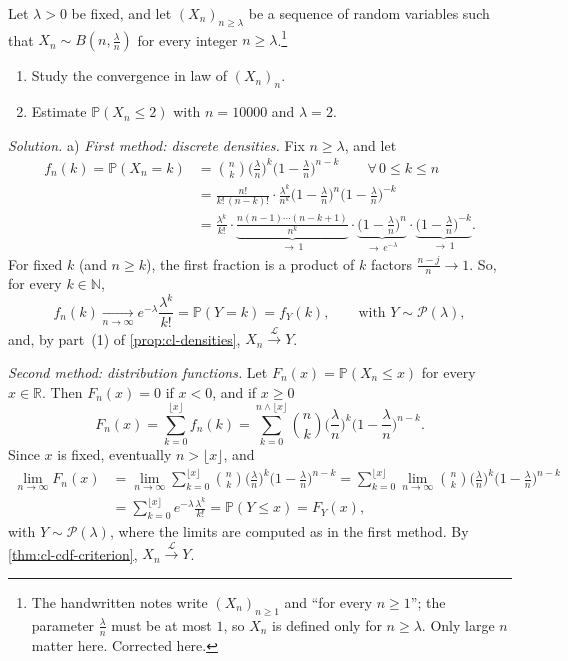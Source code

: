 \begin{example}\label{exa:cl-binomial-poisson}
Let $\lambda>0$ be fixed, and let $(X_n)_{n\ge\lambda}$ be a sequence of random variables such
that $X_n\sim B(n,\frac\lambda n)$ for every integer $n\ge\lambda$.\footnote{The handwritten
notes write $(X_n)_{n\ge1}$ and ``for every $n\ge1$''; the parameter $\frac\lambda n$ must be at
most $1$, so $X_n$ is defined only for $n\ge\lambda$. Only large $n$ matter here. Corrected
here.}
\begin{enumerate}[label=\alph*)]
  \item Study the convergence in law of $(X_n)_n$.
  \item Estimate $\mathbb P(X_n\le2)$ with $n=10000$ and $\lambda=2$.
\end{enumerate}

\emph{Solution.} a) \emph{First method: discrete densities.} Fix $n\ge\lambda$, and let
\[
\begin{aligned}
  f_n(k)=\mathbb P(X_n=k)&=\binom nk\Big(\frac\lambda n\Big)^k\Big(1-\frac\lambda n\Big)^{n-k}\qquad\forall\,0\le k\le n\\
  &=\frac{n!}{k!\,(n-k)!}\cdot\frac{\lambda^k}{n^k}\Big(1-\frac\lambda n\Big)^n\Big(1-\frac\lambda n\Big)^{-k}\\
  &=\frac{\lambda^k}{k!}\cdot\underbrace{\frac{n(n-1)\cdots(n-k+1)}{n^k}}_{\to\,1}
  \cdot\underbrace{\Big(1-\frac\lambda n\Big)^n}_{\to\,e^{-\lambda}}
  \cdot\underbrace{\Big(1-\frac\lambda n\Big)^{-k}}_{\to\,1}.
\end{aligned}
\]
For fixed $k$ (and $n\ge k$), the first fraction is a product of $k$ factors $\frac{n-j}n\to1$.
So, for every $k\in\mathbb N$,
\[
  f_n(k)\xrightarrow[n\to\infty]{}e^{-\lambda}\frac{\lambda^k}{k!}=\mathbb P(Y=k)=f_Y(k),
  \qquad\text{with }Y\sim\mathcal P(\lambda),
\]
and, by part~(1) of \cref{prop:cl-densities}, $X_n\xrightarrow{\mathcal L}Y$.

\emph{Second method: distribution functions.} Let $F_n(x)=\mathbb P(X_n\le x)$ for every
$x\in\mathbb R$. Then $F_n(x)=0$ if $x<0$, and if $x\ge0$
\[
  F_n(x)=\sum_{k=0}^{\lfloor x\rfloor}f_n(k)=\sum_{k=0}^{n\wedge\lfloor x\rfloor}\binom nk\Big(\frac\lambda n\Big)^k\Big(1-\frac\lambda n\Big)^{n-k}.
\]
Since $x$ is fixed, eventually $n>\lfloor x\rfloor$, and
\[
\begin{aligned}
  \lim_{n\to\infty}F_n(x)&=\lim_{n\to\infty}\sum_{k=0}^{\lfloor x\rfloor}\binom nk\Big(\frac\lambda n\Big)^k\Big(1-\frac\lambda n\Big)^{n-k}
  =\sum_{k=0}^{\lfloor x\rfloor}\lim_{n\to\infty}\binom nk\Big(\frac\lambda n\Big)^k\Big(1-\frac\lambda n\Big)^{n-k}\\
  &=\sum_{k=0}^{\lfloor x\rfloor}e^{-\lambda}\frac{\lambda^k}{k!}=\mathbb P(Y\le x)=F_Y(x),
\end{aligned}
\]
with $Y\sim\mathcal P(\lambda)$, where the limits are computed as in the first method. By \cref{thm:cl-cdf-criterion},
$X_n\xrightarrow{\mathcal L}Y$.


\end{example}
